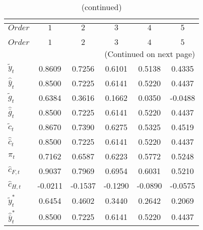  
\begin{center}
\begin{longtable}{lccccc} 
\caption{COEFFICIENTS OF AUTOCORRELATION}\\
 \label{Table:th_autocorr_matrix}\\
\toprule 
$Order                $	 & 	 $          1$	 & 	 $          2$	 & 	 $          3$	 & 	 $          4$	 & 	 $          5$\\
\midrule \endfirsthead 
\caption{(continued)}\\
 \toprule \\ 
$Order                $	 & 	 $          1$	 & 	 $          2$	 & 	 $          3$	 & 	 $          4$	 & 	 $          5$\\
\midrule \endhead 
\midrule \multicolumn{6}{r}{(Continued on next page)} \\ \bottomrule \endfoot 
\bottomrule \endlastfoot 
${\tilde y_t}         $	 & 	     0.8609	 & 	     0.7256	 & 	     0.6101	 & 	     0.5138	 & 	     0.4335 \\ 
${\hat {\bar y}_t}    $	 & 	     0.8500	 & 	     0.7225	 & 	     0.6141	 & 	     0.5220	 & 	     0.4437 \\ 
${\tilde g_t}         $	 & 	     0.6384	 & 	     0.3616	 & 	     0.1662	 & 	     0.0350	 & 	    -0.0488 \\ 
${\hat {\bar g}_t}    $	 & 	     0.8500	 & 	     0.7225	 & 	     0.6141	 & 	     0.5220	 & 	     0.4437 \\ 
${\tilde c_t}         $	 & 	     0.8670	 & 	     0.7390	 & 	     0.6275	 & 	     0.5325	 & 	     0.4519 \\ 
${\hat {\bar c}_t}    $	 & 	     0.8500	 & 	     0.7225	 & 	     0.6141	 & 	     0.5220	 & 	     0.4437 \\ 
${\pi_t}              $	 & 	     0.7162	 & 	     0.6587	 & 	     0.6223	 & 	     0.5772	 & 	     0.5248 \\ 
${\hat c_{F,t}}       $	 & 	     0.9037	 & 	     0.7969	 & 	     0.6954	 & 	     0.6031	 & 	     0.5210 \\ 
${\hat c_{H,t}}       $	 & 	    -0.0211	 & 	    -0.1537	 & 	    -0.1290	 & 	    -0.0890	 & 	    -0.0575 \\ 
${\tilde y_t^*}       $	 & 	     0.6454	 & 	     0.4602	 & 	     0.3440	 & 	     0.2642	 & 	     0.2069 \\ 
${\hat {\bar y}_t^*}  $	 & 	     0.8500	 & 	     0.7225	 & 	     0.6141	 & 	     0.5220	 & 	     0.4437 \\ 

\end{longtable}
\end{center}
